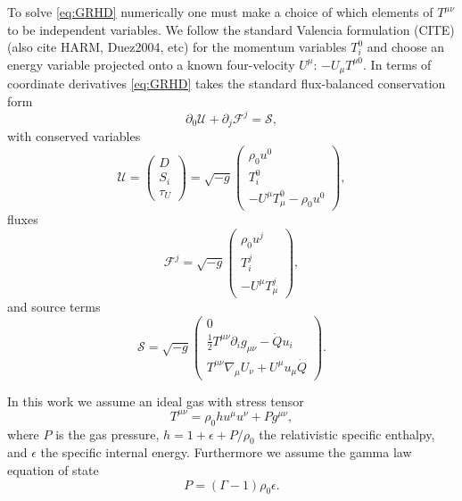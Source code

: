 \documentclass{emulateapj}
\newcommand{\Gam}{\Gamma}
\newcommand{\eps}{\epsilon}
\newcommand{\pd}{\partial}
\begin{document}
To solve \eqref{eq:GRHD} numerically one must make a choice of which elements of $T^{\mu\nu}$ to be independent variables.  We follow the standard Valencia formulation (CITE) (also cite HARM, Duez2004, etc) for the momentum variables $T^0_i$ and choose an energy variable projected onto a known four-velocity $U^\mu$: $-U_\mu T^{\mu 0}$.
In terms of coordinate derivatives \eqref{eq:GRHD} takes the standard flux-balanced conservation form
\begin{equation}
    \pd_0 \mathcal{U} + \pd_j \mathcal{F}^j = \mathcal{S} ,
\end{equation}
with conserved variables
\begin{equation}
    \mathcal{U} = \begin{pmatrix} D \\
                            S_i \\
                            \tau_U
                \end{pmatrix} = \sqrt{-g} \begin{pmatrix} \rho_0 u^0 \\ 
                                                    T^0_i \\
                                                    -U^\mu T_\mu^0 - \rho_0 u^0 \end{pmatrix} , \label{eq:cons}
\end{equation}
fluxes
\begin{equation}
    \mathcal{F}^j = \sqrt{-g} \begin{pmatrix} \rho_0 u^j \\
                                                T^j_i \\
                                                -U^\mu T_\mu^j \end{pmatrix} ,\label{eq:fluxes}
\end{equation}
and source terms 
\begin{equation}
    \mathcal{S} = \sqrt{-g} \begin{pmatrix} 0 \\
                        \frac{1}{2}T^{\mu\nu}\pd_i g_{\mu\nu} - \dot{Q}u_i \\
                        T^{\mu\nu}\nabla_\mu U_\nu + U^\mu u_\mu \dot{Q} \end{pmatrix} .\label{eq:sources}
\end{equation}

In this work we assume an ideal gas with stress tensor
\begin{equation}
	T^{\mu\nu} = \rho_0 h u^\mu u^\nu + P g^{\mu\nu} ,
\end{equation}
where $P$ is the gas pressure, $h = 1 + \eps + P/\rho_0$ the relativistic specific enthalpy, and $\eps$ the specific internal energy. Furthermore we assume the gamma law equation of state
\begin{equation}
	P = (\Gam - 1) \rho_0 \eps .
\end{equation}
\end{document}
